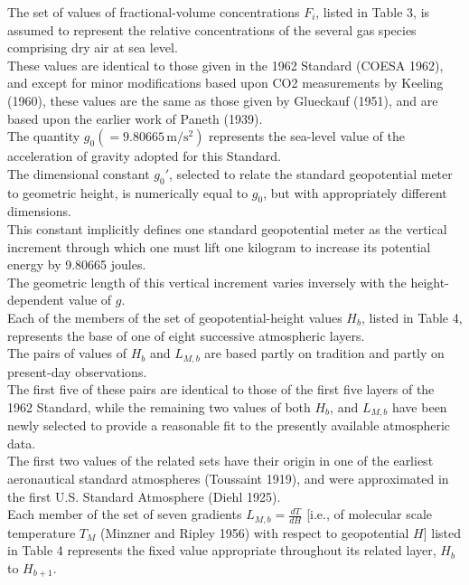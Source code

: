 \documentclass{article}
\begin{document}
The set of values of fractional-volume concentrations \(F_i\), listed in Table 3, is assumed to represent the relative concentrations of the several gas species comprising dry air at sea level.\\
These values are identical to those given in the 1962 Standard (COESA 1962), and except for minor modifications based upon CO2 measurements by Keeling (1960), these values are the same as those given by Glueckauf (1951), and are based upon the earlier work of Paneth (1939).\\

The quantity \(g_0 (= 9.80665 \, \mathrm{m/s^2})\) represents the sea-level value of the acceleration of gravity adopted for this Standard.\\

The dimensional constant \(g_0'\), selected to relate the standard geopotential meter to geometric height, is numerically equal to \(g_0\), but with appropriately different dimensions.\\
This constant implicitly defines one standard geopotential meter as the vertical increment through which one must lift one kilogram to increase its potential energy by 9.80665 joules.\\
The geometric length of this vertical increment varies inversely with the height-dependent value of \(g\).\\

Each of the members of the set of geopotential-height values \(H_b\), listed in Table 4, represents the base of one of eight successive atmospheric layers.\\
The pairs of values of \(H_b\) and \(L_{M,b}\) are based partly on tradition and partly on present-day observations.\\
The first five of these pairs are identical to those of the first five layers of the 1962 Standard, while the remaining two values of both \(H_b\), and \(L_{M,b}\) have been newly selected to provide a reasonable fit to the presently available atmospheric data.\\
The first two values of the related sets have their origin in one of the earliest aeronautical standard atmospheres (Toussaint 1919), and were approximated in the first U.S. Standard Atmosphere (Diehl 1925).\\

Each member of the set of seven gradients \(L_{M,b} = \frac{dT}{dH}\) [i.e., of molecular scale temperature \(T_M\) (Minzner and Ripley 1956) with respect to geopotential \(H\)] listed in Table 4 represents the fixed value appropriate throughout its related layer, \(H_b\) to \(H_{b+1}\).\\
\end{document}
